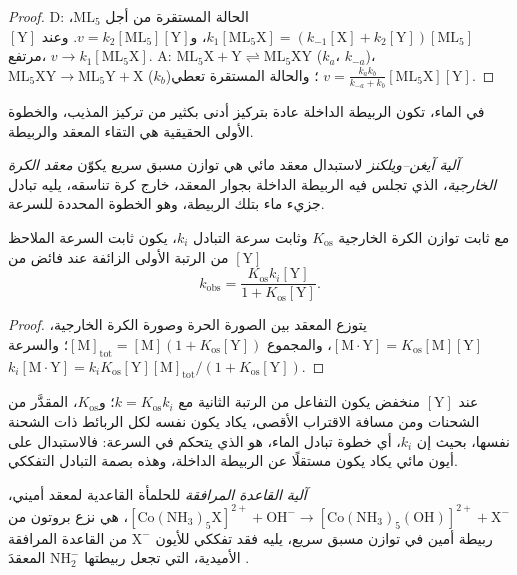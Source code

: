 \begin{proof}
D: الحالة المستقرة من أجل $\mathrm{ML_5}$، $k_1[\mathrm{ML_5X}] = (k_{-1}[\mathrm X] + k_2[\mathrm Y])[\mathrm{ML_5}]$، و$v = k_2[\mathrm{ML_5}][\mathrm Y]$.
وعند $[\mathrm Y]$ مرتفع، $v \to k_1[\mathrm{ML_5X}]$. A: $\mathrm{ML_5X} + \mathrm Y \rightleftharpoons \mathrm{ML_5XY}$ ($k_a$، $k_{-a}$)، $\mathrm{ML_5XY} \to
\mathrm{ML_5Y} + \mathrm X$ ($k_b$)؛ والحالة المستقرة تعطي $v = \frac{k_ak_b}{k_{-a} + k_b}[\mathrm{ML_5X}][\mathrm Y]$.
\end{proof}

في الماء، تكون الربيطة الداخلة عادة بتركيز أدنى بكثير من تركيز
المذيب، والخطوة الأولى الحقيقية هي التقاء المعقد 
والربيطة.

\begin{definition}\label{def:b3:complex-mechanisms:eigen-wilkins}
\emph{آلية آيغن--ويلكنز} لاستبدال
معقد مائي هي توازن مسبق سريع يكوّن
\emph{معقد الكرة الخارجية}، الذي تجلس فيه الربيطة
الداخلة بجوار المعقد، خارج كرة تناسقه، يليه
تبادل جزيء ماء بتلك الربيطة، وهو الخطوة المحددة للسرعة.
\end{definition}

\begin{theorem}\label{thm:b3:complex-mechanisms:eigen-wilkins}
مع ثابت توازن الكرة الخارجية $K_{\mathrm{os}}$ وثابت سرعة التبادل
$k_i$، يكون ثابت السرعة الملاحظ من الرتبة الأولى الزائفة عند فائض من $[\mathrm Y]$
\[
  k_{\mathrm{obs}} = \frac{K_{\mathrm{os}}k_i[\mathrm Y]}{1 + K_{\mathrm{os}}[\mathrm Y]} .
\]
\end{theorem}

\begin{proof}
يتوزع المعقد بين الصورة الحرة وصورة الكرة الخارجية، $[\mathrm{M\cdot Y}] = K_{\mathrm{os}}[\mathrm M][\mathrm Y]$،
والمجموع $[\mathrm M]_{\mathrm{tot}} = [\mathrm M](1 + K_{\mathrm{os}}[\mathrm Y])$؛ والسرعة $k_i[\mathrm{M\cdot Y}] = k_iK_{\mathrm{os}}[\mathrm Y][\mathrm M]_{\mathrm{tot}}/(1 + K_{\mathrm{os}}[\mathrm Y])$.
\end{proof}

عند $[\mathrm Y]$ منخفض يكون التفاعل من الرتبة الثانية مع $k = K_{\mathrm{os}}k_i$؛ و$K_{\mathrm{os}}$، المقدَّر من
الشحنات ومن مسافة الاقتراب الأقصى، يكاد يكون نفسه لكل
الربائط ذات الشحنة نفسها، بحيث إن $k_i$، أي خطوة تبادل الماء، هو الذي يتحكم في
السرعة: فالاستبدال على أيون مائي يكاد يكون مستقلًا عن الربيطة
الداخلة، وهذه بصمة التبادل التفككي.

\begin{definition}\label{def:b3:complex-mechanisms:conjugate-base}
\emph{آلية القاعدة المرافقة} للحلمأة
القاعدية لمعقد أميني، $\mathrm{[Co(NH_3)_5X]^{2+} + OH^- \to [Co(NH_3)_5(OH)]^{2+} + X^-}$، هي
نزع بروتون من ربيطة أمين في توازن مسبق سريع، يليه
فقد تفككي للأيون $\mathrm X^-$ من القاعدة المرافقة الأميدية، التي تجعل ربيطتها $\mathrm{NH_2^-}$
المعقدَ .
\end{definition}

